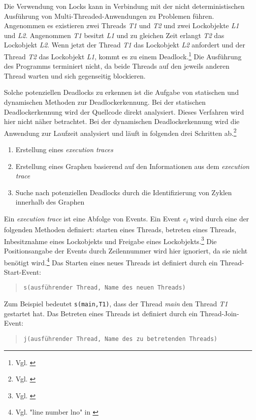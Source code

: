 Die Verwendung von Locks kann in Verbindung mit der nicht deterministischen
Ausführung von Multi-Threaded-Anwendungen zu Problemen führen. Angenommen es
existieren zwei Threads \emph{T1} und \emph{T2} und zwei Lockobjekte \emph{L1}
und \emph{L2}. Angenommen \emph{T1} besitzt \emph{L1} und zu gleichen Zeit
erlangt \emph{T2} das Lockobjekt \emph{L2}. Wenn jetzt der Thread \emph{T1} das
Lockobjekt \emph{L2} anfordert und der Thread \emph{T2} das Lockobjekt
\emph{L1}, kommt es zu einem Deadlock.\footnote{Vgl.
\autocite[70]{coffman1971system}} Die Ausführung des Programms terminiert nicht,
da beide Threads auf den jeweils anderen Thread warten und sich gegenseitig
blockieren.

Solche potenziellen Deadlocks zu erkennen ist die Aufgabe von statischen und
dynamischen Methoden zur Deadlockerkennung. Bei der statischen Deadlockerkennung
wird der Quellcode direkt analysiert. Dieses Verfahren wird hier nicht näher
betrachtet. Bei der dynamischen Deadlockerkennung wird die Anwendung zur
Laufzeit analysiert und läuft in folgenden drei Schritten ab.\footnote{Vgl.
\autocite[212-213]{bensalem2005dynamic}}
\begin{enumerate}
  \item Erstellung eines \emph{execution traces}
  \item Erstellung eines Graphen basierend auf den Informationen aus dem \emph{execution trace}
  \item Suche nach potenziellen Deadlocks durch die Identifizierung von Zyklen
  innerhalb des Graphen
\end{enumerate}
Ein \emph{execution trace} ist eine Abfolge von Events. Ein Event
\emph{e\textsubscript{i}} wird durch eine der folgenden Methoden definiert:
starten eines Threads, betreten eines Threads, Inbesitznahme eines Lockobjekts
und Freigabe eines Lockobjekts.\footnote{Vgl.
\autocite[212]{bensalem2005dynamic}} Die Positionsangabe der Events durch
Zeilennummer wird hier ignoriert, da sie nicht benötigt wird.\footnote{Vgl.
"line number lno" in \autocite[212]{bensalem2005dynamic}} Das Starten eines
neues Threads ist definiert durch ein Thread-Start-Event:
\begin{quote}
\texttt{s(ausführender Thread, Name des neuen Threads)}
\end{quote}
Zum Beispiel bedeutet \texttt{s(main,T1)}, dass der Thread \emph{main} den
Thread \emph{T1} gestartet hat. Das Betreten eines Threads ist definiert durch
ein Thread-Join-Event:
\begin{quote}
\texttt{j(ausführender Thread, Name des zu betretenden Threads)}
\end{quote}
